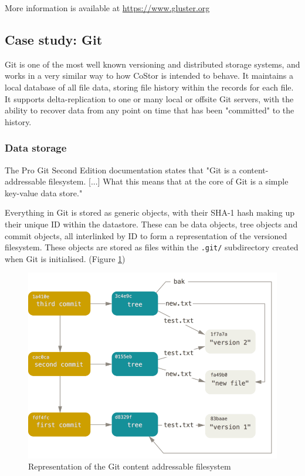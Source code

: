 \documentclass[bsc,frontabs,twoside,singlespacing,parskip,deptreport]{infthesis}     %
\begin{document}
More information is available at \url{https://www.gluster.org} \cite{gluster-home}

\subsection{Case study: Git}

Git is one of the most well known versioning and distributed storage systems, and works in a very
similar way to how CoStor is intended to behave. It maintains a local database of all file data, 
storing file history within the records for each file. It supports delta-replication to one or
many local or offsite Git servers, with the ability to recover data from any point on time that
has been "committed" to the history.

\subsubsection{Data storage}

The Pro Git Second Edition documentation \cite{progit} states that "Git is a content-addressable filesystem. [...]
What this means that at the core of Git is a simple key-value data store."

Everything in Git is stored as generic objects, with their SHA-1 hash making up their unique ID
within the datastore. These can be data objects, tree objects and commit objects, all interlinked by
ID to form a representation of the versioned filesystem. These objects are stored as files within
the \texttt{.git/} subdirectory created when Git is initialised. (Figure \ref{fig:gitfs})

\begin{figure}
	\includegraphics[width=0.6\paperwidth]{img/git-tree}
	\caption{Representation of the Git content addressable filesystem \cite{progit}}
	\label{fig:gitfs}
\end{figure}
\end{document}
